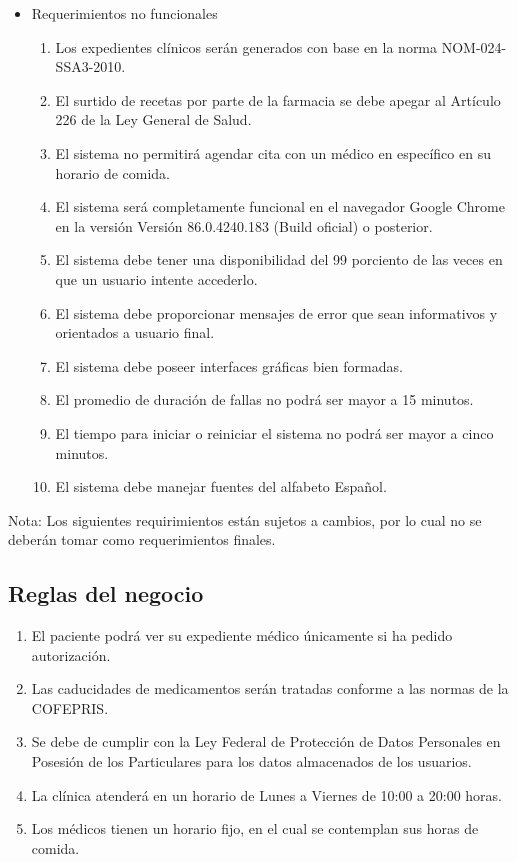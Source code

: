 \documentclass[12pt,letterpaper]{article}
\begin{document}
\begin{itemize}
\begin{enumerate}
                    \end{enumerate}
                    \item Requerimientos no funcionales
                    \begin{enumerate}
                        \item Los expedientes clínicos serán generados con base en la norma NOM-024-SSA3-2010.
                        \item El surtido de recetas por parte de la farmacia se debe apegar al Artículo 226 de la Ley General de Salud.
                        \item El sistema no permitirá agendar cita con un médico en específico en su horario de comida.
                        \item El sistema será completamente funcional en el navegador Google Chrome en la versión Versión 86.0.4240.183 (Build oficial) o posterior.
                        \item El sistema debe tener una disponibilidad del 99 porciento de las veces en que un usuario intente accederlo.
                        \item El sistema debe proporcionar mensajes de error que sean informativos y orientados a usuario final.
                        \item El sistema debe poseer interfaces gráficas bien formadas.
                        \item El promedio de duración de fallas no podrá ser mayor a 15 minutos.
                        \item El tiempo para iniciar o reiniciar el sistema no podrá ser mayor a cinco minutos.
                        \item El sistema debe manejar fuentes del alfabeto Español.
                    \end{enumerate}
            \end{itemize}
            Nota: Los siguientes requirimientos están sujetos a cambios, por lo cual no se deberán tomar como requerimientos finales.
        \subsection{Reglas del negocio}
            \begin{enumerate}
                \item El paciente podrá ver su expediente médico únicamente si ha pedido autorización.
                \item Las caducidades de medicamentos serán tratadas conforme a las normas de la COFEPRIS.
                \item Se debe de cumplir con la Ley Federal de Protección de Datos Personales en Posesión de los Particulares para los datos almacenados de los usuarios.
                \item La clínica atenderá en un horario de Lunes a Viernes de 10:00 a 20:00 horas.
                \item Los médicos tienen un horario fijo, en el cual se contemplan sus horas de comida.
            \end{enumerate}
\end{document}
